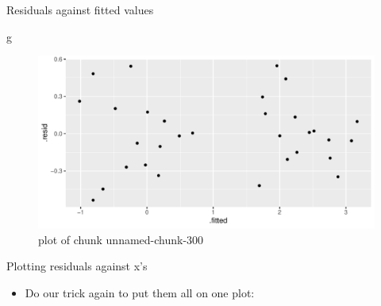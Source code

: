 \documentclass[ignorenonframetext,]{beamer}
\newenvironment{Shaded}{\begin{snugshade}}{\end{snugshade}}
\newcommand{\DataTypeTok}[1]{\textcolor[rgb]{0.13,0.29,0.53}{#1}}
\newcommand{\DecValTok}[1]{\textcolor[rgb]{0.00,0.00,0.81}{#1}}
\newcommand{\FloatTok}[1]{\textcolor[rgb]{0.00,0.00,0.81}{#1}}
\newcommand{\KeywordTok}[1]{\textcolor[rgb]{0.13,0.29,0.53}{\textbf{#1}}}
\newcommand{\NormalTok}[1]{#1}
\newcommand{\OperatorTok}[1]{\textcolor[rgb]{0.81,0.36,0.00}{\textbf{#1}}}
\newcommand{\StringTok}[1]{\textcolor[rgb]{0.31,0.60,0.02}{#1}}
\providecommand{\tightlist}{%
  \setlength{\itemsep}{0pt}\setlength{\parskip}{0pt}}
\begin{document}
\begin{frame}[fragile]{Residuals against fitted values}
\protect\hypertarget{residuals-against-fitted-values}{}

\begin{Shaded}
\begin{Highlighting}[]
\NormalTok{g}
\end{Highlighting}
\end{Shaded}

\begin{figure}
\centering
\includegraphics{figure/unnamed-chunk-300-1.pdf}
\caption{plot of chunk unnamed-chunk-300}
\end{figure}

\end{frame}

\begin{frame}[fragile]{Plotting residuals against x's}
\protect\hypertarget{plotting-residuals-against-xs}{}

\begin{itemize}
\tightlist
\item
  Do our trick again to put them all on one plot:
\end{itemize}

\begin{Shaded}
\end{Shaded}

\end{frame}
\end{document}
